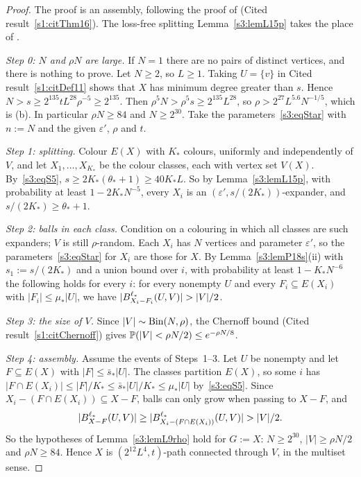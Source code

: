 \begin{proof}
The proof is an assembly, following the proof of \cite[Theorem~16]{BM}
(Cited result~\ref{s1:citThm16}). The loss-free splitting
Lemma~\ref{s3:lemL15p} takes the place of \cite[Lemma~15]{BM}.

\smallskip\noindent\emph{Step 0: $N$ and $\rho N$ are large.}
If $N=1$ there are no pairs of distinct vertices, and there is nothing
to prove. Let $N\ge2$, so $L\ge1$. Taking $U=\{v\}$ in
Cited result~\ref{s1:citDef11} shows that $X$ has minimum degree greater than
$s$. Hence $N>s\ge2^{135}tL^{28}\rho^{-5}\ge2^{135}$. Then
$\rho^5N>\rho^5s\ge2^{135}L^{28}$, so $\rho>2^{27}L^{5.6}N^{-1/5}$, which
is (b). In particular $\rho N\ge84$ and $N\ge2^{30}$. Take the
parameters~\eqref{s3:eqStar} with $n:=N$ and the given $\varepsilon'$,
$\rho$ and $t$.

\smallskip\noindent\emph{Step 1: splitting.} Colour $E(X)$ with $K_*$
colours, uniformly and independently of $V$, and let
$X_1,\dots,X_{K_*}$ be the colour classes, each with vertex set $V(X)$.
By~\ref{s3:eqS5}, $s\ge2K_*(\theta_*+1)\ge40K_*L$. So by
Lemma~\ref{s3:lemL15p}, with probability at least $1-2K_*N^{-5}$, every
$X_i$ is an $(\varepsilon',s/(2K_*))$-expander, and
$s/(2K_*)\ge\theta_*+1$.

\smallskip\noindent\emph{Step 2: balls in each class.} Condition on a
colouring in which all classes are such expanders; $V$ is still
$\rho$-random. Each $X_i$ has $N$ vertices and parameter $\varepsilon'$,
so the parameters~\eqref{s3:eqStar} for $X_i$ are those for $X$. By
Lemma~\ref{s3:lemP18s}(ii) with $s_1:=s/(2K_*)$ and a union bound over
$i$, with probability at least $1-K_*N^{-6}$ the following holds for
every $i$: for every nonempty $U$ and every $F_i\subseteq E(X_i)$ with
$|F_i|\le\mu_*|U|$, we have $|\Ball{\ell_*}{X_i-F_i}{U,V}|>|V|/2$.

\smallskip\noindent\emph{Step 3: the size of $V$.} Since
$|V|\sim\mathrm{Bin}(N,\rho)$, the Chernoff bound (Cited result~\ref{s1:citChernoff})
gives $\mathbb{P}(|V|<\rho N/2)\le e^{-\rho N/8}$.

\smallskip\noindent\emph{Step 4: assembly.} Assume the events of
Steps~1--3. Let $U$ be nonempty and let $F\subseteq E(X)$ with
$|F|\le\bar s_*|U|$. The classes partition $E(X)$, so some $i$ has
$|F\cap E(X_i)|\le|F|/K_*\le\bar s_*|U|/K_*\le\mu_*|U|$
by~\ref{s3:eqS5}. Since $X_i-(F\cap E(X_i))\subseteq X-F$, balls can only
grow when passing to $X-F$, and
\[
|\Ball{\ell_*}{X-F}{U,V}|\ge|\Ball{\ell_*}{X_i-(F\cap E(X_i))}{U,V}|>|V|/2 .
\]
So the hypotheses of Lemma~\ref{s3:lemL9rho} hold for $G:=X$:
$N\ge2^{30}$, $|V|\ge\rho N/2$ and $\rho N\ge84$. Hence $X$ is
$(2^{12}L^4,t)$-path connected through $V$, in the multiset sense.


\end{proof}
